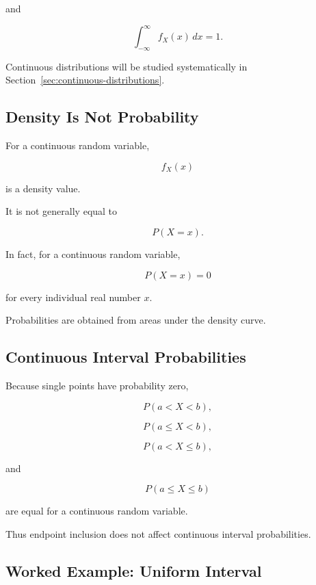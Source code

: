 and

\[
\boxed{
\int_{-\infty}^{\infty}f_X(x)\,dx=1.
}
\]

Continuous distributions will be studied systematically in
Section~\ref{sec:continuous-distributions}.

\subsection{Density Is Not Probability}
\label{subsec:density-not-probability}

For a continuous random variable,

\[
f_X(x)
\]

is a density value.

It is not generally equal to

\[
P(X=x).
\]

In fact, for a continuous random variable,

\[
\boxed{
P(X=x)=0
}
\]

for every individual real number \(x\).

Probabilities are obtained from areas under the density curve.

\subsection{Continuous Interval Probabilities}
\label{subsec:continuous-interval-probabilities}

Because single points have probability zero,

\[
P(a<X<b),
\]

\[
P(a\leq X<b),
\]

\[
P(a<X\leq b),
\]

and

\[
P(a\leq X\leq b)
\]

are equal for a continuous random variable.

Thus endpoint inclusion does not affect continuous interval
probabilities.

\subsection{Worked Example: Uniform Interval}
\label{subsec:worked-uniform-rv-preview}

